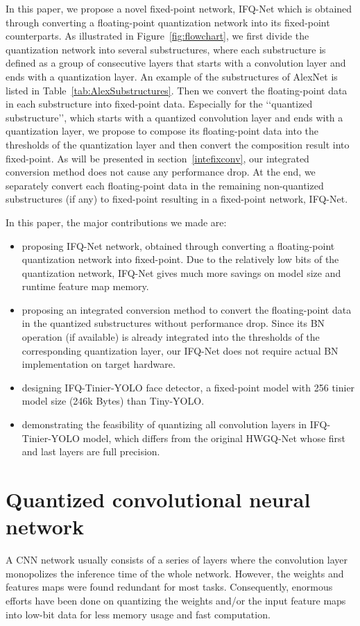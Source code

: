 \documentclass[10pt,twocolumn,letterpaper]{article}
\begin{document}
In this paper,  we propose a novel fixed-point network, IFQ-Net which is obtained through converting a floating-point quantization network into its fixed-point counterparts. As illustrated in Figure~\ref{fig:flowchart}, we first divide the quantization network into several substructures, where each substructure is defined as a group of consecutive layers that starts with a convolution layer and ends with a quantization layer. An example of the substructures of AlexNet is listed in Table~\ref{tab:AlexSubstructures}. Then we convert the floating-point data in each substructure into fixed-point data. Especially for the \lq\lq quantized substructure\rq\rq, which starts with a quantized convolution layer and ends with a quantization layer, we propose to compose its floating-point data into the thresholds of the quantization layer and then convert the composition result into fixed-point. As will be presented in section~\ref{intefixconv}, our integrated conversion method does not cause any performance drop. At the end, we separately convert each floating-point data in the remaining non-quantized substructures (if any) to fixed-point resulting in a fixed-point network, IFQ-Net. 

In this paper, the major contributions we made are:
\begin{itemize}
\item proposing IFQ-Net network, obtained through converting a floating-point quantization network into fixed-point. Due to the relatively low bits of the quantization network, IFQ-Net gives much more savings on model size and runtime feature map memory.\item proposing an integrated conversion method to convert the floating-point data in the quantized substructures without performance drop. Since its BN operation (if available) is already integrated into the thresholds of the corresponding quantization layer, our IFQ-Net does not require actual BN implementation on target hardware. \item designing IFQ-Tinier-YOLO face detector, a fixed-point model with 256 tinier model size (246k Bytes) than Tiny-YOLO.\item demonstrating the feasibility of quantizing all convolution layers in IFQ-Tinier-YOLO model, which differs from the original HWGQ-Net whose first and last layers are full precision.
\end{itemize}


\section{Quantized convolutional neural network}\label{Sec:QCNN}
A CNN network usually consists of a series of layers where the convolution layer monopolizes the inference time of the whole network. However, the weights and features maps were found redundant for most tasks. Consequently, enormous efforts have been done on quantizing the weights and/or the input feature maps into low-bit data for less memory usage and fast computation. 
\end{document}
